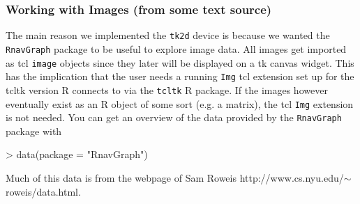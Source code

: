 \documentclass[12pt,oneside,titlepage,letter]{article}
\newcommand{\modify}[1]{{\color{blue}#1}}
\begin{document}
\subsubsection{Working with Images (from some text source)}
The main reason we implemented the \texttt{tk2d} device is because we wanted the \texttt{RnavGraph} package to be useful to explore image data. All images get imported as tcl \texttt{image} objects since they later will be displayed on a tk canvas widget. This has the implication that the user needs a running \texttt{Img} tcl extension set up for the tcltk version R connects to via the \texttt{tcltk} R package. If the images however eventually exist as an R object of some sort (e.g. a matrix), the tcl \texttt{Img} extension is not needed. You can get an overview of the data provided by the \texttt{RnavGraph} package with
\begin{Schunk}
\begin{Sinput}
> data(package = "RnavGraph")
\end{Sinput}
\end{Schunk}
\modify{Much of this data is from the webpage of Sam Roweis \tiny{http://www.cs.nyu.edu/$\sim$roweis/data.html}}.\\
\end{document}
